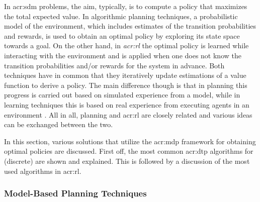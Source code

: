In \acrshort{acr:sdm} problems, the aim, typically, is to compute a policy that maximizes the total expected value.
In algorithmic planning techniques, a probabilistic model of the environment, which includes estimates of the transition probabilities and rewards, is used to obtain an optimal policy by exploring its state space towards a goal.
On the other hand, in \textit{\acrfull{acr:rl}} the optimal policy is learned while interacting with the environment and is applied when one does not know the transition probabilities and/or rewards for the system in advance.
Both techniques have in common that they iteratively update estimations of a value function to derive a policy.
The main difference though is that in planning this progress is carried out based on simulated experience from a model, while in learning techniques this is based on real experience from executing agents in an environment \cite{sutton1998reinforcement}.
All in all, planning and \acrshort{acr:rl} are closely related and various ideas can be exchanged between the two.

In this section, various solutions that utilize the \acrshort{acr:mdp} framework for obtaining optimal policies are discussed.
First off, the most common \acrshort{acr:dtp} algorithms for (discrete)  are shown and explained.
This is followed by a discussion of the most used algorithms in \acrshort{acr:rl}.





\subsubsection{Model-Based Planning Techniques}
\label{sec:model-based-planning}

